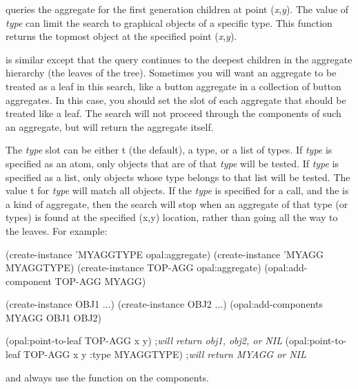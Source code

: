 queries the aggregate for the first generation
children at point ({\it x},{\it y}).  The value of {\it type} can limit the search to
graphical objects of a specific type.  This function returns the topmost
object at the specified point ({\it x},{\it y}).

 is similar except that the query continues to the deepest
children in the aggregate hierarchy (the leaves of the tree).  Sometimes you
will want an aggregate to be treated as a leaf in this search, like a button
aggregate in a collection of button aggregates.  In this case, you should set
the   slot of each
aggregate that should be treated like a leaf.  The search will not
proceed through the components of such an aggregate, but will return
the aggregate itself.

The {\it type} slot can be either {\sc t} (the default), a type, or a list
of types.
If {\it type} is specified as an atom, only objects that are of that
{\it type} will be tested.  If {\it type} is specified as a list, only
objects whose type belongs to that list will be tested.
The value {\sc t} for {\it type} will match all objects.  If the {\it type} is
specified for a  call, and the  is a kind of
aggregate, then the search will stop when an aggregate of that type (or
types) is found at the specified (x,y) location, rather than going all
the way to the leaves.  For example:
\begin{programexample}
(create-instance 'MYAGGTYPE opal:aggregate)
(create-instance 'MYAGG MYAGGTYPE)
(create-instance TOP-AGG opal:aggregate)
(opal:add-component TOP-AGG MYAGG)

(create-instance OBJ1 ...)
(create-instance OBJ2 ...)
(opal:add-components MYAGG OBJ1 OBJ2)

(opal:point-to-leaf TOP-AGG x y) ;{\it will return obj1, obj2, or NIL}
(opal:point-to-leaf TOP-AGG x y :type MYAGGTYPE) ;{\it will return MYAGG or NIL}
\end{programexample}

 and  always use the function
 on the components.



